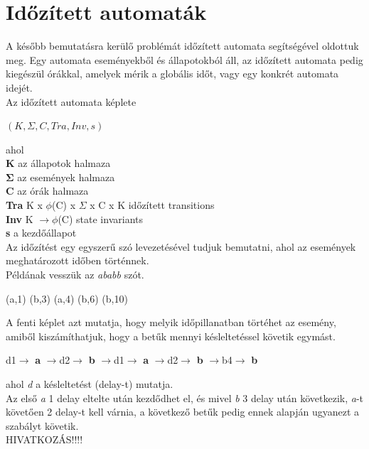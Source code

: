 \documentclass {report}
\begin{document}
\section{Időzített automaták}
A később bemutatásra kerülő problémát időzített automata segítségével oldottuk meg. Egy automata eseményekből és állapotokból áll, az időzített automata pedig kiegészül órákkal, amelyek mérik a globális időt, vagy egy konkrét automata idejét. \\
Az időzített automata képlete\\
\begin{center}
$(K, \Sigma, C, Tra, Inv, s)$\\
\end{center}
ahol\\
\indent \textbf{K} az állapotok halmaza\\
\indent $\mathbf{\Sigma}$ az események halmaza\\
\indent \textbf{C} az órák halmaza\\
\indent \textbf{Tra} K x $\phi$(C) x $ \Sigma $ x C x K időzített transitions\\
\indent \textbf{Inv} K $
\rightarrow  \phi$(C) state invariants\\
\indent \textbf{s} a kezdőállapot \\
Az időzítést egy egyszerű szó levezetésével tudjuk bemutatni, ahol az események meghatározott időben történnek.\\
Példának vesszük az \emph{ababb} szót.
\begin{center}
(a,1) (b,3) (a,4) (b,6) (b,10)
\end{center}
A fenti képlet azt mutatja, hogy melyik időpillanatban törtéhet az esemény, amiből kiszámíthatjuk, hogy a betűk mennyi késleltetéssel követik egymást. 
\begin{center}
d1$\rightarrow$ \textbf{a} $\rightarrow$d2$\rightarrow$ \textbf{b} $\rightarrow$d1$\rightarrow$ \textbf{a} $\rightarrow$d2$\rightarrow$ \textbf{b} $\rightarrow$b4$\rightarrow$ \textbf{b}
\end{center}
ahol \emph{d} a késleltetést (delay-t) mutatja.\\
Az első \emph{a} 1 delay eltelte után kezdődhet el, és mivel \emph{b} 3 delay után következik, \emph{a}-t követően 2 delay-t kell várnia, a következő betűk pedig ennek alapján ugyanezt a szabályt követik. \\

HIVATKOZÁS!!!!
\end{document}

